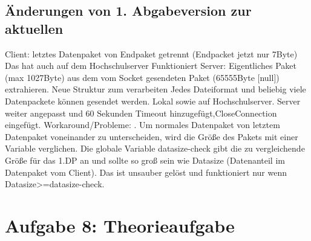 \documentclass {article}[a4paper,12pt]
\begin{document}
\subsection{Änderungen von 1. Abgabeversion zur aktuellen}
Client: letztes Datenpaket von Endpaket getrennt (Endpacket jetzt nur 7Byte)
\newline
Das hat auch auf dem Hochschulserver Funktioniert
\newline
Server: Eigentliches Paket (max 1027Byte) aus dem vom Socket gesendeten Paket (65555Byte [null]) extrahieren. Neue Struktur zum verarbeiten
\newline
Jedes Dateiformat und beliebig viele Datenpackete können gesendet werden. Lokal sowie auf Hochschulserver.
\newline
Server weiter angepasst und 60 Sekunden Timeout hinzugefügt,CloseConnection eingefügt.
 Workaround/Probleme:
. Um normales Datenpaket von letztem Datenpaket voneinander zu unterscheiden, wird die Größe des Pakets mit einer Variable verglichen.
Die globale Variable datasize-check gibt die zu vergleichende Größe für das 1.DP an und sollte so groß sein wie Datasize (Datenanteil im Datenpaket vom Client).
Das ist unsauber gelöst und funktioniert nur wenn Datasize>=datasize-check.
\newpage
\section{Aufgabe 8: Theorieaufgabe}
\end{document}
